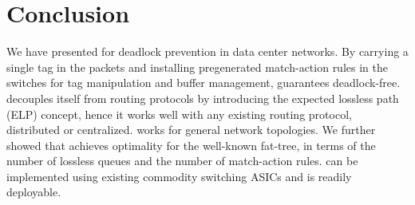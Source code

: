 \section{Conclusion}\label{sec:conclusion}
We have presented \sysname{}  for deadlock prevention in data center networks. 
By carrying a single tag in the packets and installing pregenerated match-action rules in the switches
for tag manipulation and buffer management, \sysname{}  guarantees deadlock-free. 
\sysname{}  decouples itself from routing protocols by introducing the expected lossless path (ELP) concept, 
hence it works well with any existing routing protocol, distributed or centralized. \sysname{}  works for 
general network topologies. We further showed that \sysname{}  achieves optimality for the well-known fat-tree, 
in terms of the number of lossless queues and the number of match-action rules. \sysname{}  can be 
implemented using existing commodity switching ASICs and is readily deployable.  
